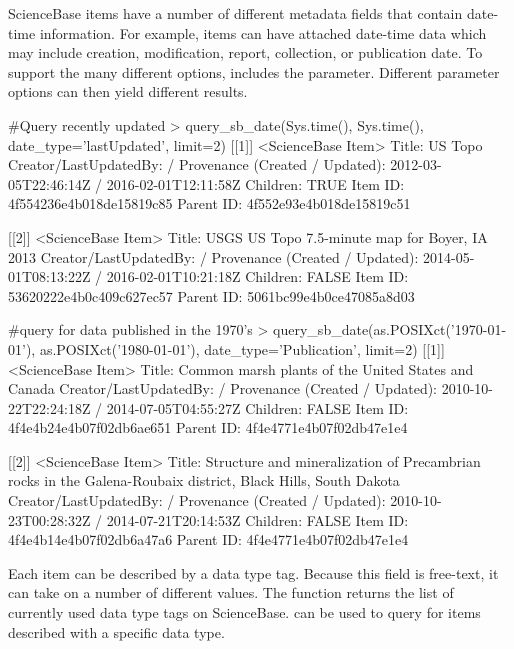 ScienceBase items have a number of different metadata fields that contain
date-time information. For example, items can have attached date-time 
data which may include creation, modification, report, collection, or 
publication date. To support the many different options, 
includes the  parameter. Different parameter options can then
yield different results.

\begin{example}
#Query recently updated 
> query_sb_date(Sys.time(), Sys.time(), date_type='lastUpdated', limit=2)
[[1]]
<ScienceBase Item> 
  Title: US Topo
  Creator/LastUpdatedBy:      / 
  Provenance (Created / Updated):  2012-03-05T22:46:14Z / 2016-02-01T12:11:58Z
  Children: TRUE
  Item ID: 4f554236e4b018de15819c85
  Parent ID: 4f552e93e4b018de15819c51
  
[[2]]
<ScienceBase Item> 
  Title: USGS US Topo 7.5-minute map for Boyer, IA 2013
  Creator/LastUpdatedBy:      / 
  Provenance (Created / Updated):  2014-05-01T08:13:22Z / 2016-02-01T10:21:18Z
  Children: FALSE
  Item ID: 53620222e4b0c409c627ec57
  Parent ID: 5061bc99e4b0ce47085a8d03

#query for data published in the 1970's
> query_sb_date(as.POSIXct('1970-01-01'), as.POSIXct('1980-01-01'), date_type='Publication', limit=2)
[[1]]
<ScienceBase Item> 
  Title: Common marsh plants of the United States and Canada
  Creator/LastUpdatedBy:      / 
  Provenance (Created / Updated):  2010-10-22T22:24:18Z / 2014-07-05T04:55:27Z
  Children: FALSE
  Item ID: 4f4e4b24e4b07f02db6ae651
  Parent ID: 4f4e4771e4b07f02db47e1e4

[[2]]
<ScienceBase Item> 
  Title: Structure and mineralization of Precambrian rocks in the Galena-Roubaix district, Black Hills, South Dakota
  Creator/LastUpdatedBy:      / 
  Provenance (Created / Updated):  2010-10-23T00:28:32Z / 2014-07-21T20:14:53Z
  Children: FALSE
  Item ID: 4f4e4b14e4b07f02db6a47a6
  Parent ID: 4f4e4771e4b07f02db47e1e4
  
\end{example}

Each item can be described by a data type tag. Because this field is free-text, it can take on a 
number of different values. The function  returns the list of currently used 
data type tags on ScienceBase.  can be used to query for items described
with a specific data type.

